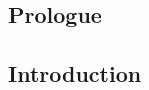 \begin{fullwidth}
\part[PROLOGUE]{Prologue}

\chapter[INTRODUCTION]{Introduction}
\label{chap:introduction}
\end{fullwidth}


